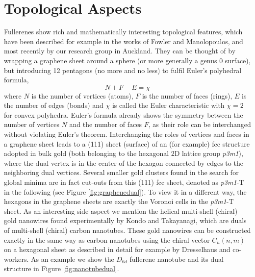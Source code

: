 \section{\label{sec:TopAsp}Topological Aspects}

Fullerenes show rich and mathematically interesting topological features\autocite{Cataldo-Ori-2011,Schwerdtfeger_topologyfullerenes_2015}, which have been described for example in the works of Fowler and Manolopoulos\autocite{Fowler-atlas-2006}, and most recently by our research group in Auckland.\autocite{Schwerdtfeger_topologyfullerenes_2015} They can be thought of by wrapping a graphene sheet around a sphere (or more generally a genus 0 surface), but introducing 12 pentagons (no more and no less) to fulfil Euler's polyhedral formula, 
\begin{equation}
  \label{eq:euler} 
  N + F -E = \chi 
\end{equation}
where $N$ is the number of vertices (atoms), $F$ is the number of faces (rings), $E$ is the number of edges (bonds)
and $\chi$ is called the Euler characteristic with $\chi=2$ for convex polyhedra.\autocite{Kotschick_TopologyCombinatoricsSoccer_2006} Euler's formula already shows the symmetry between the number of vertices $N$ and the number of faces $F$, as their role can be interchanged without violating Euler's theorem. Interchanging the roles of vertices and faces in a graphene sheet leads to a (111) sheet (surface) of an (for example) fcc structure adopted in bulk gold (both belonging to the hexagonal 2D lattice group \textit{p3m1}), where the dual vertex is in the center of the hexagon connected by edges to the neighboring dual vertices. Several smaller gold clusters found in the search for global minima are in fact cut-outs from this (111) fcc sheet,\autocite{Assadollahzadeh_systematicsearchminimum_2009} denoted as \textit{p3m1}-T in the following (see Figure \ref{fig:graphenedual}). To view it in a different way, the hexagons in the graphene sheets are exactly the Voronoi cells in the \textit{p3m1}-T sheet. As an interesting side aspect we mention the helical multi-shell (chiral) gold nanowires found experimentally by Kondo and Takayanagi,\autocite{Kondo-2000} which are duals of multi-shell (chiral) carbon nanotubes.\autocite{Johansson_Au3224CaratGolden_2004} These gold nanowires can be constructed exactly in the same way as carbon nanotubes using the chiral vector $C_h(n,m)$ on a hexagonal sheet as described in detail for example by Dresselhaus and co-workers.\autocite{Dresselhaus-1992} As an example we show the $D_{6d}$ fullerene nanotube and its dual structure in Figure \ref{fig:nanotubedual}.


